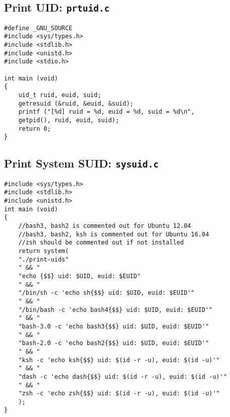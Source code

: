 \documentclass[a4paper,12pt]{article}
\begin{document}
\subsection{Print UID: \texttt{prtuid.c}}
\label{addnotes}
\begin{verbatim}
#define _GNU_SOURCE
#include <sys/types.h>
#include <stdlib.h>
#include <unistd.h>
#include <stdio.h>

int main (void)
{
    uid_t ruid, euid, suid;
    getresuid (&ruid, &euid, &suid);
    printf ("[%d] ruid = %d, euid = %d, suid = %d\n",
    getpid(), ruid, euid, suid);
    return 0;
}
\end{verbatim}
\newpage
\subsection{Print System SUID: \texttt{sysuid.c}}
\begin{verbatim}
#include <sys/types.h>
#include <stdlib.h>
#include <unistd.h>
int main (void)
{
	//bash3, bash2 is commented out for Ubuntu 12.04
	//bash3, bash2, ksh is commented out for Ubuntu 16.04
	//zsh should be commented out if not installed
	return system(
	"./print-uids"
	" && "
	"echo {$$} uid: $UID, euid: $EUID"
	" && "
	"/bin/sh -c 'echo sh{$$} uid: $UID, euid: $EUID'"
	" && "
	"/bin/bash -c 'echo bash4{$$} uid: $UID, euid: $EUID'"
	" && "
	"bash-3.0 -c 'echo bash3{$$} uid: $UID, euid: $EUID'"
	" && "
	"bash-2.0 -c 'echo bash2{$$} uid: $UID, euid: $EUID'"
	" && "
	"ksh -c 'echo ksh{$$} uid: $(id -r -u), euid: $(id -u)'"
	" && "
	"dash -c 'echo dash{$$} uid: $(id -r -u), euid: $(id -u)'"
	" && "
	"zsh -c 'echo zsh{$$} uid: $(id -r -u), euid: $(id -u)'"
	);
}
\end{verbatim}
\end{document}
